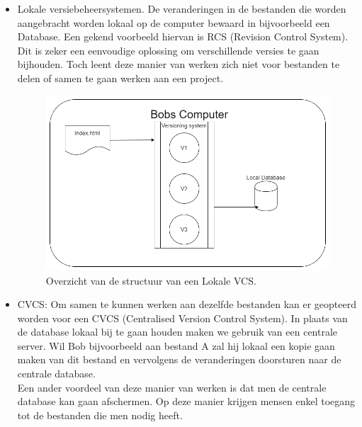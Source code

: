 \begin{itemize}
	\item Lokale versiebeheersystemen. De veranderingen in de bestanden die worden aangebracht worden lokaal op de computer bewaard in bijvoorbeeld een Database. Een gekend voorbeeld hiervan is RCS (Revision Control System). Dit is zeker een eenvoudige oplossing om verschillende versies te gaan bijhouden. Toch leent deze manier van werken zich niet voor bestanden te delen of samen te gaan werken aan een project.\\
	
\begin{figure}[h!]
	\centering
	\caption[Overzicht structuur Lokale VCS]{Overzicht van de structuur van een Lokale VCS.}
	\label{fig:lvcs}
	\includegraphics[scale=0.5]{LVCS.png}
\end{figure}

	\item CVCS: Om samen te kunnen werken aan dezelfde bestanden kan er geopteerd worden voor een CVCS (Centralised Version Control System). In plaats van de database lokaal bij te gaan houden maken we gebruik van een centrale server. Wil Bob bijvoorbeeld aan bestand A zal hij lokaal een kopie gaan maken van dit bestand en vervolgens de veranderingen doorsturen naar de centrale database. \\ 

Een ander voordeel van deze manier van werken is dat men de centrale database kan gaan afschermen. Op deze manier krijgen mensen enkel toegang tot de bestanden die men nodig heeft.\\


\end{itemize}

